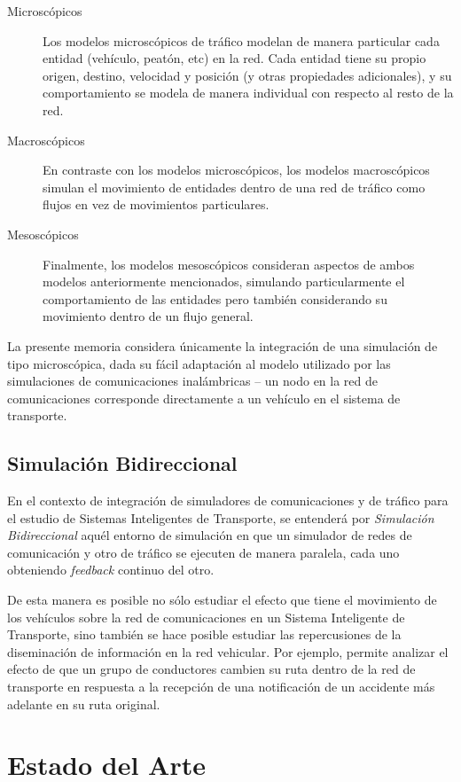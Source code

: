 \begin{description}
    \item[Microscópicos] Los modelos microscópicos de tráfico modelan de manera particular cada entidad (vehículo, peatón, etc) en la red. Cada entidad tiene su propio origen, destino, velocidad y posición (y otras propiedades adicionales), y su comportamiento se modela de manera individual con respecto al resto de la red. 
    \item[Macroscópicos] En contraste con los modelos microscópicos, los modelos macroscópicos simulan el movimiento de entidades dentro de una red de tráfico como flujos en vez de movimientos particulares.
    \item[Mesoscópicos] Finalmente, los modelos mesoscópicos consideran aspectos de ambos modelos anteriormente mencionados, simulando particularmente el comportamiento de las entidades pero también considerando su movimiento dentro de un flujo general.
\end{description}

La presente memoria considera únicamente la integración de una simulación de tipo microscópica, dada su fácil adaptación al modelo utilizado por las simulaciones de comunicaciones inalámbricas -- un nodo en la red de comunicaciones corresponde directamente a un vehículo en el sistema de transporte.

\subsection{Simulación Bidireccional}

En el contexto de integración de simuladores de comunicaciones y de tráfico para el estudio de Sistemas Inteligentes de Transporte, se entenderá por \emph{Simulación Bidireccional} aquél entorno de simulación en que un simulador de redes de comunicación y otro de tráfico se ejecuten de manera paralela, cada uno obteniendo \emph{feedback} continuo del otro.

De esta manera es posible no sólo estudiar el efecto que tiene el movimiento de los vehículos sobre la red de comunicaciones en un Sistema Inteligente de Transporte, sino también se hace posible estudiar las repercusiones de la diseminación de información en la red vehicular. Por ejemplo, permite analizar el efecto de que un grupo de conductores cambien su ruta dentro de la red de transporte en respuesta a la recepción de una notificación de un accidente más adelante en su ruta original.

\section{Estado del Arte}

